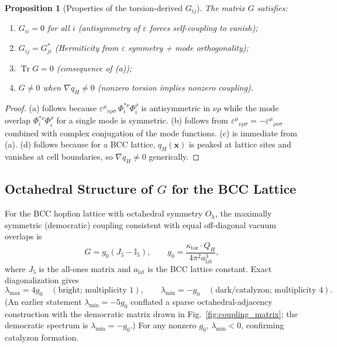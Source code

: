 \documentclass[11pt,letterpaper]{article}
\newtheorem{proposition}[theorem]{Proposition}
\begin{document}
\begin{proposition}[Properties of the torsion-derived $G_{ij}$]
\label{prop:G_properties}
The matrix $G$ satisfies:
\begin{enumerate}[label=(\alph*)]
    \item $G_{ii} = 0$ for all $i$ (antisymmetry of $\varepsilon$ forces self-coupling to vanish);
    \item $G_{ij} = G_{ji}^*$ (Hermiticity from $\varepsilon$ symmetry + mode orthogonality);
    \item $\operatorname{Tr} G = 0$ (consequence of (a));
    \item $G \neq 0$ when $\nabla q_H \neq 0$ (nonzero torsion implies nonzero coupling).
\end{enumerate}
\end{proposition}

\begin{proof}
(a) follows because $\varepsilon^{\mu}{}_{\nu\rho\sigma}\, \Phi_i^{*\nu} \Phi_i^\rho$ is antisymmetric in $\nu\rho$ while the mode overlap $\Phi_i^{*\nu}\Phi_i^\rho$ for a single mode is symmetric. (b) follows from $\varepsilon^{\mu}{}_{\nu\rho\sigma} = -\varepsilon^{\mu}{}_{\rho\nu\sigma}$ combined with complex conjugation of the mode functions. (c) is immediate from (a). (d) follows because for a BCC lattice, $q_H(\mathbf{x})$ is peaked at lattice sites and vanishes at cell boundaries, so $\nabla q_H \neq 0$ generically.
\end{proof}

\subsection{Octahedral Structure of $G$ for the BCC Lattice}

For the BCC hopfion lattice with octahedral symmetry $O_h$, the maximally symmetric (democratic) coupling consistent with equal off-diagonal vacuum overlaps is
\begin{equation}
G = g_0 \left(J_5 - \mathbb{I}_5\right),\qquad
g_0 = \frac{\kappa_{\text{tor}} \cdot Q_H}{4\pi^2 a_{\text{lat}}^3},
\end{equation}
where $J_5$ is the all-ones matrix and $a_{\text{lat}}$ is the BCC lattice constant. Exact diagonalization gives
\begin{equation}
\lambda_{\max}=4g_0\quad(\text{bright; multiplicity }1),\qquad
\lambda_{\min}=-g_0\quad(\text{dark/catalyzon; multiplicity }4).
\end{equation}
(An earlier statement $\lambda_{\min}=-5g_0$ conflated a sparse octahedral-adjacency construction with the democratic matrix drawn in Fig.~\ref{fig:coupling_matrix}; the democratic spectrum is $\lambda_{\min}=-g_0$.) For any nonzero $g_0$, $\lambda_{\min}<0$, confirming catalyzon formation.
\end{document}
